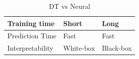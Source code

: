 \documentclass[12pt]{article}
\theoremstyle{definition}
\begin{document}
\begin{table}
\begin{tabular}{|l|l|l|}
Training time          & Short                                                                                                                                      & Long                                                                                                                                                            \\ \hline
Prediction Time        & Fast                                                                                                                                       & Fast                                                                                                                                                            \\ \hline
Interpretability       & White-box                                                                                                                                  & Black-box                                                                                                                                                       \\ \hline
\end{tabular}
\caption{DT vs Neural}
\end{table}
\end{document}
